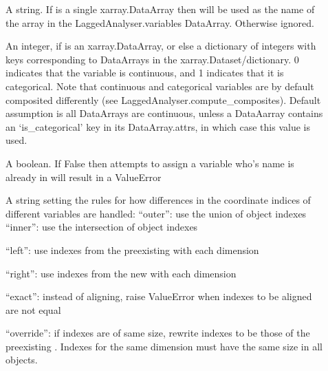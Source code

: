 \documentclass[letterpaper,10pt,english]{sphinxmanual}
\begin{document}
\begin{fulllineitems}
\begin{fulllineitems}
\begin{description}
\end{description}

\sphinxAtStartPar
{}
\begin{description}
\item[{ }] \leavevmode
\sphinxAtStartPar
A string. If  is a single xarray.DataArray then  will be used as the name of the array in the LaggedAnalyser.variables DataArray. Otherwise ignored.

\item[{ }] \leavevmode
\sphinxAtStartPar
An integer, if  is an xarray.DataArray, or else a dictionary of integers with keys corresponding to DataArrays in the xarray.Dataset/dictionary. 0 indicates that the variable is continuous, and 1 indicates that it is categorical. Note that continuous and categorical variables are by default composited differently (see LaggedAnalyser.compute\_composites). Default assumption is all DataArrays are continuous, unless a DataAarray contains an ‘is\_categorical’ key in its DataArray.attrs, in which case this value is used.

\item[{}] \leavevmode
\sphinxAtStartPar
A boolean. If False then attempts to assign a variable who’s name is already in  will result in a ValueError

\item[{}] \leavevmode
\sphinxAtStartPar
A string setting the rules for how differences in the coordinate indices of different variables are handled:
“outer”: use the union of object indexes
“inner”: use the intersection of object indexes

\sphinxAtStartPar
“left”: use indexes from the pre\sphinxhyphen{}existing  with each dimension

\sphinxAtStartPar
“right”: use indexes from the new  with each dimension

\sphinxAtStartPar
“exact”: instead of aligning, raise ValueError when indexes to be aligned are not equal

\sphinxAtStartPar
“override”: if indexes are of same size, rewrite indexes to be those of the pre\sphinxhyphen{}existing . Indexes for the same dimension must have the same size in all objects.


\end{description}
\end{fulllineitems}
\end{fulllineitems}
\end{document}
